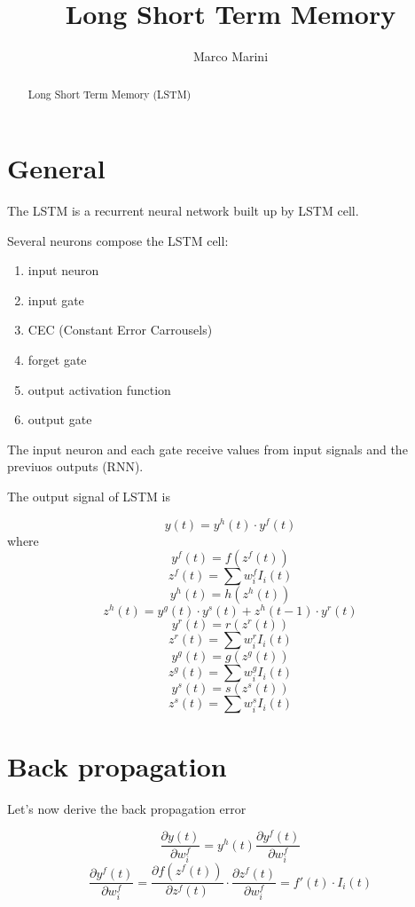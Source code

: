 \documentclass[a4paper,11pt]{article}
\title{Long Short Term Memory}
\author{Marco Marini}
\begin{document}
\maketitle
\tableofcontents

\begin{abstract}
Long Short Term Memory (LSTM)
\end{abstract}

\section{General}

The LSTM is a recurrent neural network built up  by LSTM cell.

Several neurons compose the LSTM cell:

\begin{enumerate}
	\item input neuron
	\item input gate
	\item CEC (Constant Error Carrousels)
	\item forget gate
	\item output activation function
	\item output gate
\end{enumerate}

The input neuron and each gate receive values from input signals and the previuos outputs (RNN).

The output signal of LSTM is

\[ 
	y(t) = y^h(t) \cdot y^f(t)
\]
where 
\[
	y^f(t) = f\left( z^f(t) \right) 
\]
\[ 
	z^f(t) = \sum w^f_i I_i(t)
\]
\[
	y^h(t) = h\left( z^h(t) \right) 
\]
\[ 
	z^h(t) = y^g(t) \cdot y^s(t) + z^h(t-1) \cdot y^r(t)
\]
\[ 
	y^r(t) = r \left( z^r(t) \right)
\]
\[ 
	z^r(t) = \sum w^r_i I_i(t)
\]
\[ 
	y^g(t) = g \left( z^g(t) \right)
\]
\[ 
	z^g(t) = \sum w^g_i I_i(t)
\]
\[ 
	y^s(t) = s \left( z^s(t) \right)
\]
\[ 
	z^s(t) = \sum w^s_i I_i(t)
\]

\section{Back propagation}

Let's now derive the back propagation error

\[ 
	\frac{\partial y(t)}{\partial w^f_i} = y^h(t) \frac{\partial y^f(t)}{\partial w^f_i}
\]
\[ 
	\frac{\partial y^f(t)}{\partial w^f_i} =
		\frac{\partial f\left( z^f(t) \right)}{\partial z^f(t)}
		\cdot \frac{\partial z^f(t) }{\partial  w^f_i}
		= f'(t) \cdot  I_i(t)
\]
\end{document}
